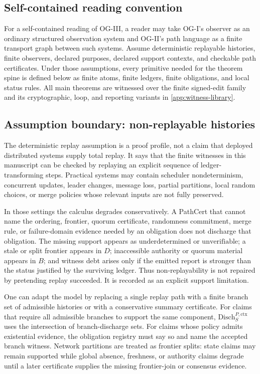 \documentclass[11pt,twoside]{article}
\theoremstyle{definition}
\newcommand{\Disch}{\mathrm{Disch}}
\newcommand{\ctx}{\mathrm{ctx}}
\newcommand{\underdetermined}{\mathrm{underdetermined}}
\newcommand{\unverifiable}{\mathrm{unverifiable}}
\begin{document}
\subsection{Self-contained reading convention}

For a self-contained reading of OG-III, a reader may take OG-I's observer as an
ordinary structured observation system and OG-II's path language as a finite
transport graph between such systems. Assume deterministic replayable histories,
finite observers, declared purposes, declared support contexts, and checkable
path certificates. Under those assumptions, every primitive needed for the
theorem spine is defined below as finite atoms, finite ledgers, finite
obligations, and local status rules. All main theorems are witnessed over the
finite signed-edit family and its cryptographic, loop, and reporting variants
in \cref{app:witness-library}.

\subsection{Assumption boundary: non-replayable histories}
\label{sec:nonreplayable-histories}

The deterministic replay assumption is a proof profile, not a claim that
deployed distributed systems supply total replay. It says that the finite
witnesses in this manuscript can be checked by replaying an explicit sequence of
ledger-transforming steps. Practical systems may contain scheduler
nondeterminism, concurrent updates, leader changes, message loss, partial
partitions, local random choices, or merge policies whose relevant inputs are not
fully preserved.

In those settings the calculus degrades conservatively. A PathCert that cannot
name the ordering, frontier, quorum certificate, randomness commitment, merge
rule, or failure-domain evidence needed by an obligation does not discharge that
obligation. The missing support appears as $\underdetermined$ or
$\unverifiable$; a stale or split frontier appears in $D$; inaccessible authority
or quorum material appears in $B$; and witness debt arises only if the emitted
report is stronger than the status justified by the surviving ledger. Thus
non-replayability is not repaired by pretending replay succeeded. It is recorded
as an explicit support limitation.

One can adapt the model by replacing a single replay path with a finite branch
set of admissible histories or with a conservative summary certificate. For
claims that require all admissible branches to support the same component,
$\Disch_S^{P,\ctx}$ uses the intersection of branch-discharge sets. For claims
whose policy admits existential evidence, the obligation registry must say so and
name the accepted branch witness. Network partitions are treated as frontier
splits: state claims may remain supported while global absence, freshness, or
authority claims degrade until a later certificate supplies the missing
frontier-join or consensus evidence.
\end{document}
